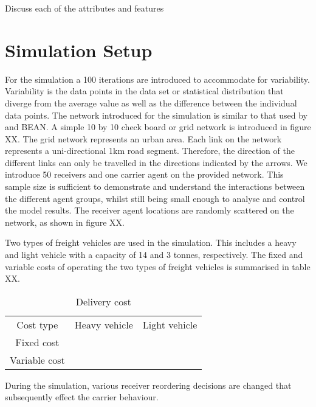 Discuss each of the attributes and features



\section{Simulation Setup}

For the simulation a 100 iterations are introduced to accommodate for variability. Variability is the data points in the data set or statistical distribution that diverge from the average value  as well as the difference between the individual data points. The network introduced for the simulation is similar to that used by \citet{schroeder2012towards} and BEAN. A simple 10 by 10 check board or grid network is introduced in figure XX. The grid network represents an urban area. Each link on the network represents a uni-directional 1km road segment. Therefore, the direction of the different links can only be travelled in the directions indicated by the arrows. We introduce 50 receivers and one carrier agent on the provided network. This sample size is sufficient to demonstrate and understand the interactions between the different agent groups, whilst still being small enough to analyse and control the model results. The receiver agent locations are randomly scattered on the network, as shown in figure XX. 



Two types of freight vehicles are used in the simulation. This includes a heavy and light vehicle with a capacity of 14 and 3 tonnes, respectively. The fixed and variable costs of operating the two types of freight vehicles is summarised in table XX.

\begin{table}[h]
    \centering
    \begin{tabular}{c|c|c}
     Cost type & Heavy vehicle & Light vehicle\\
     Fixed cost & & \\
     Variable cost& & \\
    \end{tabular}
    \caption{Delivery cost}
    \label{tab:my_label}
\end{table}


During the simulation, various receiver reordering decisions are changed that subsequently effect the carrier behaviour.